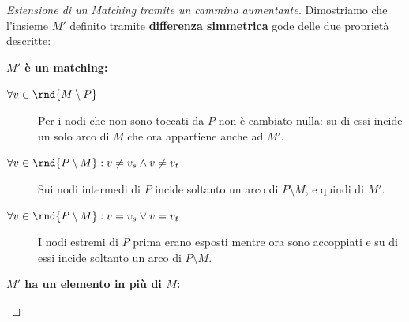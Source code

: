 \documentclass[\main/main.tex]{subfiles}
\begin{document}
\begin{proof}[Estensione di un Matching tramite un cammino aumentante]
	Dimostriamo che l'insieme \(M'\) definito tramite \textbf{differenza simmetrica} gode delle due proprietà descritte:
	\begin{description}
		\item \textbf{\(M'\) è un matching:}
		      \begin{description}
			      \item[\(\forall v \in \rnd{M \setminus P}\)] Per i nodi che non sono toccati da \(P\) non è cambiato nulla: su di essi incide un solo arco di \(M\) che ora appartiene anche ad \(M'\).
			      \item[\(\forall v \in \rnd{P \setminus M}: v\neq v_s \land v \neq v_t\)] Sui nodi intermedi di \(P\) incide soltanto un arco di \(P\setminus M\), e quindi di \(M'\).
			      \item[\(\forall v \in \rnd{P \setminus M}: v= v_s \lor v = v_t\)] I nodi estremi di \(P\) prima erano esposti mentre ora sono accoppiati e su di essi incide soltanto un arco di \(P\setminus M\).
		      \end{description}
		\item \textbf{\(M'\) ha un elemento in più di \(M\):}
	\end{description}
\end{proof}
\clearpage
\end{document}
